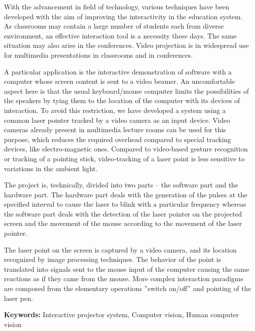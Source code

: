 \thispagestyle{plain}
\begin{center}
	\large
	\vspace{0.5cm}	
\end{center}

        With the advancement in field of technology, various techniques have been developed with the aim of improving the interactivity in the education system. As classrooms may contain a large number of students each from diverse environment, an effective interaction tool is a necessity these days. The same situation may also arise in the conferences. Video projection is in widespread use for multimedia presentations in classrooms and in conferences. 

A particular application is the interactive demonstration of software with a computer whose screen content is sent to a video beamer. An uncomfortable aspect here is that the usual keyboard/mouse computer limits the possibilities of the speakers by tying them to the location of the computer with its devices of interaction. To avoid this restriction, we have developed a system using a common laser pointer tracked by a video camera as an input device. Video cameras already present in multimedia lecture rooms can be used for this purpose, which reduces the required overhead compared to special tracking devices, like electro-magnetic ones. Compared to video-based gesture recognition or tracking of a pointing stick, video-tracking of a laser point is less sensitive to variations in the ambient
light.

The project is, technically, divided into two parts – the software part and the hardware part. The hardware part deals with the generation of the pulses at the specified interval to cause the laser to blink with a particular frequency whereas the software part deals with the detection of the laser pointer on the projected screen and the movement of the mouse according to the movement of the laser pointer.

The laser point on the screen is captured by a video camera, and its location recognized by image processing techniques. The behavior of the point is translated into signals sent to the mouse input of the computer causing the same reactions as if they came from the mouse. More complex interaction paradigms are composed from the elementary operations ”switch on/off” and pointing of the laser pen.

\textbf{Keywords:} Interactive projector system, Computer vision, Human computer vision